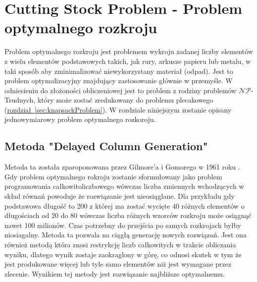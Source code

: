 \section{Cutting Stock Problem - Problem optymalnego rozkroju}
\label{sec:cuttingStockProblem}
\newcommand{\mf}[1]{\textbf{\textit{#1}}}
\newcommand{\tsub}[1]{\textsubscript{#1}}
\newcommand{\tsuper}[1]{\textsuperscript{#1}}

Problem optymalnego rozkroju jest problemem wykroju zadanej liczby elementów z wielu elementów podstawowych takich, jak rury, arkusze papieru lub metalu, w taki sposób aby zminimalizować niewykorzystany materiał (odpad). Jest to problem optymalizacyjny znajdujący zastosowanie głównie w przemyśle.  W odniesieniu do  złożoności obliczeniowej jest to problem z rodziny problemów $\mathcal{NP}$-Trudnych, który może zostać zredukowany do problemu plecakowego (\hyperref[sec:knapsackProblem]{rozdział~\ref*{sec:knapsackProblem}}). W rozdziale niniejszym zostanie opisany jednowymiarowy problem optymalnego rozkoroju.

\subsection{Metoda "Delayed Column Generation"} \label{sec:dcg}
Metoda ta została zparoponowana przez Gilmore'a i Gomorego w 1961 roku \cite{GilmoreGomoryV1Article}. Gdy problem optymalnego rokroju zostanie sformułowany jako problem programowania całkowitoliczbowego wówczas liczba zmiennych wchodzących w skład równań powoduje że rozwiązanie jest nieosiąglane. Dla przykładu gdy podstawowa długość to 200 z której ma zostać wycięte 40 różnych elementów o długościach od 20 do 80 wówczas liczba różnych wzorców rozkroju może osiągnąć nawet 100 milionów. Czas potrzebny do przejścia po samych rozkrojach byłby niosiagalny. Metoda ta pozwala na ciągłą generację nowych rozwiązań. Jest ona również metodą która znosi restrykcję liczb całkowitych w trakcie obliczania wyniku, dlatego wynik zostaje zaokraglony w górę, co odnosi skutek w tym że jest produkowane więcej lub tyle samo elementów niż jest wymagane przez zlecenie. Wynikiem tej metody jest rozwiązanie najbliższe optymalnemu.
